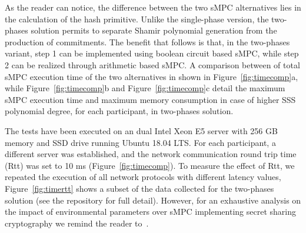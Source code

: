 As the reader can notice, the difference between the two sMPC alternatives lies in the calculation of the hash primitive. 
Unlike the single-phase version, the two-phases solution permits to separate Shamir polynomial generation from the production of commitments.
The benefit that follows is that, in the two-phases variant, step 1 can be implemented using boolean circuit based sMPC, while step 2 can be realized through arithmetic based sMPC.
A comparison between of total sMPC execution time of the two alternatives in shown in Figure~\ref{fig:timecomp}a, while Figure~\ref{fig:timecomp}b and Figure~\ref{fig:timecomp}c detail the maximum sMPC execution time and maximum memory consumption in case of higher SSS polynomial degree, for each participant, in two-phases solution. 

The tests have been executed on an dual Intel Xeon E5 server with 256 GB memory and SSD drive running Ubuntu 18.04 LTS.
For each \shortname participant, a different server was established, and the network communication round trip time (Rtt) was set to 10 ms (Figure~\ref{fig:timecomp}). 
To measure the effect of Rtt, we repeated the execution of all network protocols with different latency values, Figure~\ref{fig:timertt} shows a subset of the data collected for the two-phases solution (see the repository for full detail).   
However, for an exhaustive analysis on the impact of environmental parameters over sMPC implementing secret sharing cryptography we remind the reader to~\cite{DBLP:journals/corr/abs-1804-03548}.












